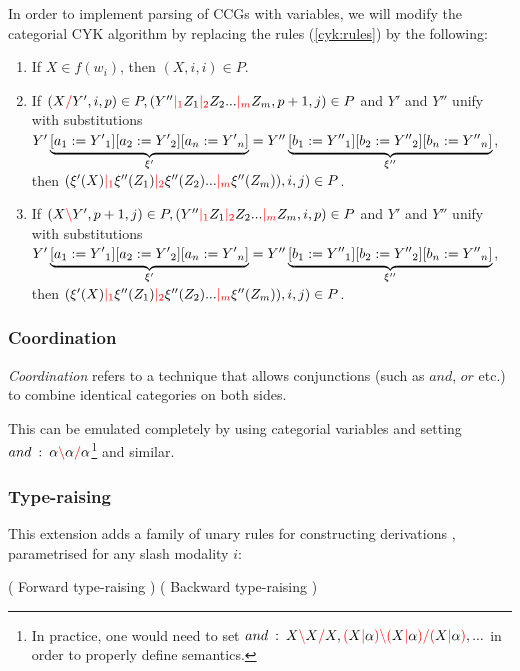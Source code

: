 \documentclass[main.tex]{subfiles}
\begin{document}
In order to implement parsing of CCGs with variables, we will modify the categorial
CYK algorithm by replacing the rules (\cref{cyk:rules}) by the following:

\begin{enumerate}
    \item If $X \in f(w_i)$, then $(X, i, i) \in P$.
    \item If $(X \textcolor{red}{/} Y', i, p) \in P, (Y'' \textcolor{red}{|_{1}} Z_1 \textcolor{red}{|_{2}} Z_2 ... \textcolor{red}{|_{m}} Z_m, p + 1, j) \in P$
        and $Y'$ and $Y''$ unify with substitutions
        $ {Y'} \underbrace{ [ a_1 := {Y'}_1 ] [ a_2 := {Y'}_2 ] [ a_n := {Y'}_n ]}_{\xi'}
        = {Y''}\underbrace{ [ b_1 := {Y''}_1 ] [ b_2 := {Y''}_2 ] [ b_n := {Y''}_n ]}_{\xi''}$, \\
        then $(\xi'(X) \textcolor{red}{|_{1}} \xi''(Z_1) \textcolor{red}{|_{2}} \xi''(Z_2) ... \textcolor{red}{|_{m}} \xi''(Z_m)), i, j) \in P$.
    \item If $(X \textcolor{red}{\backslash} Y', p + 1, j) \in P, (Y'' \textcolor{red}{|_{1}} Z_1 \textcolor{red}{|_{2}} Z_2 ... \textcolor{red}{|_{m}} Z_m, i, p) \in P$
        and $Y'$ and $Y''$ unify with substitutions
        $ {Y'} \underbrace{ [ a_1 := {Y'}_1 ] [ a_2 := {Y'}_2 ] [ a_n := {Y'}_n ]}_{\xi'}
        = {Y''}\underbrace{ [ b_1 := {Y''}_1 ] [ b_2 := {Y''}_2 ] [ b_n := {Y''}_n ]}_{\xi''}$, \\
        then $(\xi'(X) \textcolor{red}{|_{1}} \xi''(Z_1) \textcolor{red}{|_{2}} \xi''(Z_2) ... \textcolor{red}{|_{m}} \xi''(Z_m)), i, j) \in P$.
\end{enumerate}

\subsubsection{Coordination}
\emph{Coordination} refers to a technique that allows conjunctions (such as
$and$, $or$ etc.) to combine identical categories on both sides.

This can be emulated completely by using categorial variables and setting
$and \hspace{0.5em} {:} \hspace{0.5em} \alpha \textcolor{red}{\backslash} \alpha \textcolor{red}{/} \alpha $\footnote{
    In practice, one would need to set
    $and \hspace{0.5em} {:} \hspace{0.5em} X \textcolor{red}{\backslash} X \textcolor{red}{/} X, \textcolor{red}{(} X \textcolor{red}{|} \alpha \textcolor{red}{)} \textcolor{red}{\backslash} \textcolor{red}{(} X \textcolor{red}{|} \alpha \textcolor{red}{)} \textcolor{red}{/} \textcolor{red}{(} X \textcolor{red}{|} \alpha \textcolor{red}{)}, ...$
    in order to properly define semantics.
} and similar.

\subsubsection{Type-raising}
This extension adds a family of unary rules for constructing derivations \cite[sec.~5.3.1]{nts},
parametrised for any slash modality $i$:
\begin{center}
        ( Forward type-raising )
        ( Backward type-raising )
\end{center}
\end{document}
